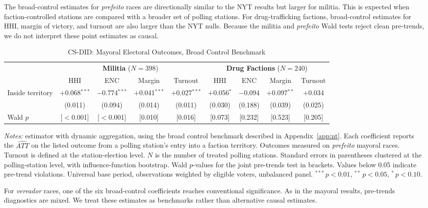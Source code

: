 \documentclass[11pt]{article}
\newcommand{\tabnotes}[1]{\par\vspace{3pt}\noindent\begin{minipage}{\linewidth}\footnotesize #1\end{minipage}}
\begin{document}
The broad-control estimates for \emph{prefeito} races are directionally similar to the NYT results but larger for militia. This is expected when faction-controlled stations are compared with a broader set of polling stations. For drug-trafficking factions, broad-control estimates for HHI, margin of victory, and turnout are also larger than the NYT nulls. Because the militia and \emph{prefeito} Wald tests reject clean pre-trends, we do not interpret these point estimates as causal.

\begin{table}[H]
\centering
\caption{CS-DID: Mayoral Electoral Outcomes, Broad Control Benchmark}\label{tab:csdid_main_nt}
\footnotesize
\begin{tabular}{@{}l cccc cccc@{}}
\toprule
 & \multicolumn{4}{c}{\textbf{Militia} ($N = 398$)} & \multicolumn{4}{c}{\textbf{Drug Factions} ($N = 240$)} \\
\cmidrule(lr){2-5} \cmidrule(lr){6-9}
 & HHI & ENC & Margin & Turnout & HHI & ENC & Margin & Turnout \\
\midrule
Inside territory & $+$0.068$^{***}$ & $-$0.774$^{***}$ & $+$0.041$^{***}$ & $+$0.027$^{***}$ & $+$0.056$^{*}$ & $-$0.094 & $+$0.097$^{**}$ & $+$0.034 \\
                 & (0.011) & (0.094) & (0.014) & (0.011) & (0.030) & (0.188) & (0.039) & (0.025) \\
Wald $p$         & [$<$0.001] & [$<$0.001] & [0.010] & [0.016] & [0.073] & [0.232] & [0.523] & [0.205] \\
\bottomrule
\end{tabular}
\tabnotes{\textit{Notes:} \citet{callaway2021did} estimator with dynamic aggregation, using the broad control benchmark described in Appendix~\ref{app:nt}. Each coefficient reports the $\widehat{ATT}$ on the listed outcome from a polling station's entry into a faction territory. Outcomes measured on \emph{prefeito} mayoral races. Turnout is defined at the station-election level. $N$ is the number of treated polling stations. Standard errors in parentheses clustered at the polling-station level, with influence-function bootstrap. Wald $p$-values for the joint pre-trends test in brackets. Values below 0.05 indicate pre-trend violations. Universal base period, observations weighted by eligible voters, unbalanced panel. $^{***}\,p<0.01$, $^{**}\,p<0.05$, $^{*}\,p<0.10$.}
\end{table}

For \emph{vereador} races, one of the six broad-control coefficients reaches conventional significance. As in the mayoral results, pre-trends diagnostics are mixed. We treat these estimates as benchmarks rather than alternative causal estimates.
\end{document}
